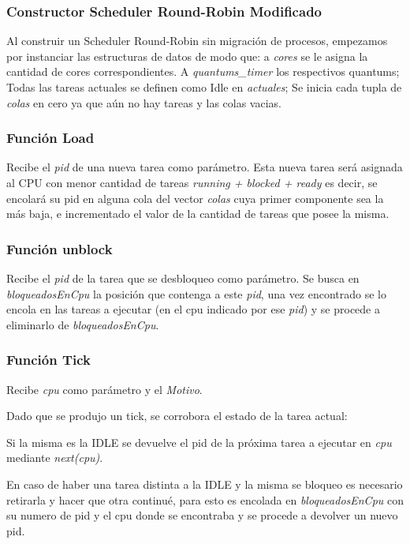 \documentclass[a4paper]{article}
\begin{document}
		
\subsubsection*{Constructor Scheduler Round-Robin Modificado}		

Al construir un Scheduler Round-Robin sin migración de procesos, empezamos por instanciar las estructuras de datos de modo que: a \emph{cores} se le asigna la cantidad de cores correspondientes. A \emph{quantums\_timer} los respectivos quantums; Todas las tareas actuales se definen como Idle en \emph{actuales}; Se inicia cada tupla de \emph{colas} en cero ya que aún no hay tareas y las colas vacias.
\subsubsection*{Funci\'on Load}

Recibe el \emph{pid} de una nueva tarea como par\'ametro. Esta nueva tarea será asignada al CPU con menor cantidad de tareas \emph{running + blocked + ready} es decir, se encolar\'a su pid en alguna cola del vector \emph{colas} cuya primer componente sea la más baja, e incrementado el valor de la cantidad de tareas que posee la misma.


\subsubsection*{Funci\'on unblock}	
Recibe el \emph{pid} de la tarea que se desbloqueo como par\'ametro.
Se busca en \emph{bloqueadosEnCpu} la posición que contenga a este \emph{pid}, una vez encontrado se lo encola en las tareas a ejecutar (en el cpu indicado por ese \emph{pid}) y se procede a eliminarlo de \emph{bloqueadosEnCpu}. 


\subsubsection*{Funci\'on Tick}	

Recibe \emph{cpu} como par\'ametro y el \emph{Motivo}. 

Dado que se produjo un tick, se corrobora el estado de la tarea actual:

Si la misma es la IDLE se devuelve el pid de la próxima tarea a ejecutar en \emph{cpu} mediante \emph{next(cpu)}. 

En caso de haber una tarea distinta a la IDLE y la misma se bloqueo es necesario retirarla y hacer que otra continué, para esto es encolada en \emph{bloqueadosEnCpu} con su numero de pid y el cpu donde se encontraba y se procede a devolver un nuevo pid.
 
\end{document}

